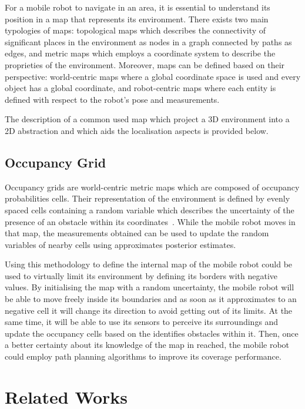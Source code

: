 \noindent For a mobile robot to navigate in an area, it is essential to understand its position in a map that represents its environment.
There exists two main typologies of maps: topological maps which describes the connectivity
of significant places in the environment as nodes in a graph connected by paths as edges, and metric maps which employs a coordinate system to describe the proprieties of the environment.
Moreover, maps can be defined based on their perspective: world-centric maps where a global coordinate space is used and every object has a global coordinate, and robot-centric maps where each entity is defined with respect to the robot's pose and measurements.

The description of a common used map which project a \gls{3D} environment into a \gls{2D} abstraction and which aids the localisation aspects is provided below.

\subsection{Occupancy Grid}
\noindent Occupancy grids are world-centric metric maps which are composed of occupancy probabilities cells.
Their representation of the environment is defined by evenly spaced cells containing a random variable which describes the uncertainty of the presence of an obstacle within its coordinates~\cite{thrun_probabilistic_2005}.
While the mobile robot moves in that map, the measurements obtained can be used to update the random variables of nearby cells using approximates posterior estimates.

Using this methodology to define the internal map of the mobile robot could be used to virtually limit its environment by defining its borders with negative values.
By initialising the map with a random uncertainty, the mobile robot will be able to move freely inside its boundaries and as soon as it approximates to an negative cell it will change its direction to avoid getting out of its limits.
At the same time, it will be able to use its sensors to perceive its surroundings and update the occupancy cells based on the identifies obstacles within it.
Then, once a better certainty about its knowledge of the map in reached, the mobile robot could employ path planning algorithms to improve its coverage performance.




\section{Related Works}

